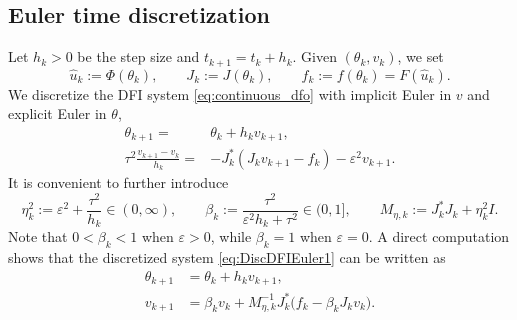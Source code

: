 \documentclass[oneside,11pt]{article}
\theoremstyle{remark}
\theoremstyle{thmstyleone}
\theoremstyle{thmstylethree}
\theoremstyle{thmstyletwo}
\begin{document}
\subsection{Euler time discretization}
Let $h_k>0$ be the step size and $t_{k+1}=t_k+h_k$. Given $(\theta_k,v_k)$, we set
        \begin{equation}
          \hat u_k:=\Phi(\theta_k),
          \qquad J_k:=J(\theta_k),
          \qquad f_k:=f(\theta_k)=F(\hat u_k).
          \label{eq:frozen_quantities}
        \end{equation}
We discretize the DFI system \eqref{eq:continuous_dfo} with implicit Euler in $v$ and explicit Euler in $\theta$, 
        \begin{equation}\label{eq:DiscDFIEuler1}
        \begin{aligned}
          \theta_{k+1}= & \theta_k+h_k v_{k+1},\\
          \tau^2\frac{v_{k+1}-v_k}{h_k} = & -J_k^*(J_kv_{k+1}-f_k)-\varepsilon^2 v_{k+1}.
        \end{aligned}
        \end{equation}
It is convenient to further introduce
        \begin{equation}
\eta_k^2:=\varepsilon^2+\frac{\tau^2}{h_k} \in (0,\infty),
          \qquad
          \beta_k:=\frac{\tau^2}{\varepsilon^2h_k + \tau^2}\in(0,1],
          \qquad
          M_{\eta,k}:=J_k^*J_k+\eta_k^2 I.
          \label{eq:beta_eta_Mk_main}
        \end{equation} Note that $0<\beta_k<1$ when $\varepsilon>0$, while $\beta_k=1$ when $\varepsilon=0$.
        A direct computation shows that the discretized system \eqref{eq:DiscDFIEuler1} can be written as 
        \begin{equation}\label{eq:beta_eta_system_eta_beta}
        \begin{aligned}
          \theta_{k+1} & = \theta_k+h_k v_{k+1},                                    \\
          v_{k+1}      & = \beta_k v_k+M_{\eta,k}^{-1}J_k^*\bigl(f_k-\beta_k J_kv_k\bigr).
        \end{aligned}
        \end{equation}
\end{document}
